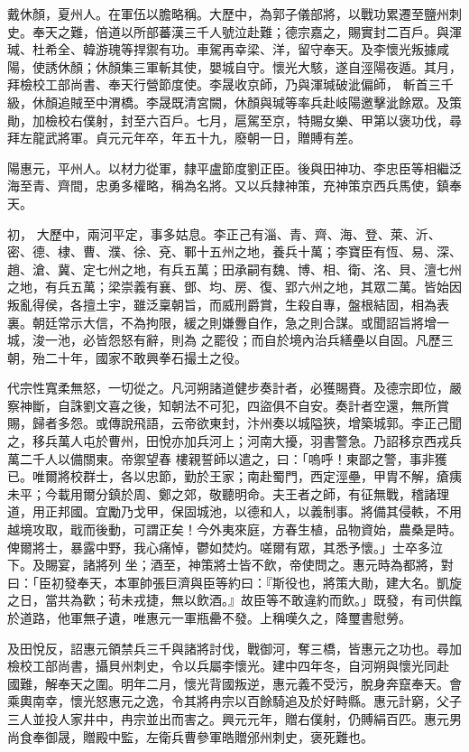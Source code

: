 \begin{pinyinscope}
 戴休顏，夏州人。在軍伍以膽略稱。大歷中，為郭子儀部將，以戰功累遷至鹽州刺史。奉天之難，倍道以所部蕃漢三千人號泣赴難；德宗嘉之，賜實封二百戶。與渾瑊、杜希全、韓游瑰等捍禦有功。車駕再幸梁、洋，留守奉天。及李懷光叛據咸陽，使誘休顏；休顏集三軍斬其使，嬰城自守。懷光大駭，遂自涇陽夜遁。其月，拜檢校工部尚書、奉天行營節度使。李晟收京師，乃與渾瑊破泚偏師，
 斬首三千級，休顏追賊至中渭橋。李晟既清宮闕，休顏與瑊等率兵赴岐陽邀擊泚餘眾。及策勛，加檢校右僕射，封至六百戶。七月，扈駕至京，特賜女樂、甲第以褒功伐，尋拜左龍武將軍。貞元元年卒，年五十九，廢朝一日，贈賻有差。



 陽惠元，平州人。以材力從軍，隸平盧節度劉正臣。後與田神功、李忠臣等相繼泛海至青、齊間，忠勇多權略，稱為名將。又以兵隸神策，充神策京西兵馬使，鎮奉天。



 初，
 大歷中，兩河平定，事多姑息。李正己有淄、青、齊、海、登、萊、沂、密、德、棣、曹、濮、徐、兗、鄆十五州之地，養兵十萬；李寶臣有恆、易、深、趙、滄、冀、定七州之地，有兵五萬；田承嗣有魏、博、相、衛、洺、貝、澶七州之地，有兵五萬；梁崇義有襄、鄧、均、房、復、郢六州之地，其眾二萬。皆始因叛亂得侯，各擅土宇，雖泛稟朝旨，而威刑爵賞，生殺自專，盤根結固，相為表裏。朝廷常示大信，不為拘限，緩之則嫌釁自作，急之則合謀。或聞詔旨將增一城，浚一池，必皆怨怒有辭，則為
 之罷役；而自於境內治兵繕壘以自固。凡歷三朝，殆二十年，國家不敢興拳石撮土之役。



 代宗性寬柔無怒，一切從之。凡河朔諸道健步奏計者，必獲賜賚。及德宗即位，嚴察神斷，自誅劉文喜之後，知朝法不可犯，四盜俱不自安。奏計者空還，無所賞賜，歸者多怨。或傳說飛語，云帝欲東封，汴州奏以城隘狹，增築城郭。李正己聞之，移兵萬人屯於曹州，田悅亦加兵河上；河南大擾，羽書警急。乃詔移京西戎兵萬二千人以備關東。帝禦望春
 樓親誓師以遣之，曰：「嗚呼！東鄙之警，事非獲已。唯爾將校群士，各以忠節，勤於王家；南赴蜀門，西定涇壘，甲胄不解，瘡痍未平；今載用爾分鎮於周、鄭之郊，敬聽明命。夫王者之師，有征無戰，稽諸理道，用正邦國。宜勵乃戈甲，保固城池，以德和人，以義制事。將備其侵軼，不用越境攻取，戢而後動，可謂正矣！今外夷來庭，方春生植，品物資始，農桑是時。俾爾將士，暴露中野，我心痛悼，鬱如焚灼。嗟爾有眾，其悉予懷。」士卒多泣下。及賜宴，諸將列
 坐；酒至，神策將士皆不飲，帝使問之。惠元時為都將，對曰：「臣初發奉天，本軍帥張巨濟與臣等約曰：『斯役也，將策大勛，建大名。凱旋之日，當共為歡；茍未戎捷，無以飲酒。』故臣等不敢違約而飲。」既發，有司供餼於道路，他軍無孑遺，唯惠元一軍瓶罍不發。上稱嘆久之，降璽書慰勞。



 及田悅反，詔惠元領禁兵三千與諸將討伐，戰御河，奪三橋，皆惠元之功也。尋加檢校工部尚書，攝貝州刺史，令以兵屬李懷光。建中四年冬，自河朔與懷光同赴
 國難，解奉天之圍。明年二月，懷光背國叛逆，惠元義不受污，脫身奔竄奉天。會乘輿南幸，懷光怒惠元之逸，令其將冉宗以百餘騎追及於好畤縣。惠元計窮，父子三人並投人家井中，冉宗並出而害之。興元元年，贈右僕射，仍賻絹百匹。惠元男尚食奉御晟，贈殿中監，左衛兵曹參軍皓贈邠州刺史，褒死難也。




\end{pinyinscope}
